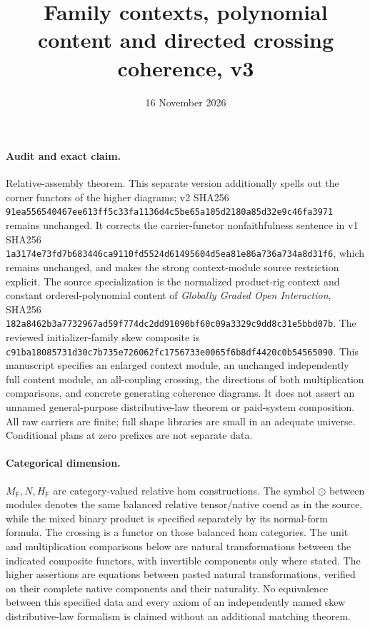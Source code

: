 \documentclass[11pt]{article}
\title{Family contexts, polynomial content and directed crossing coherence, v3}
\date{16 November 2026}
\begin{document}
\maketitle
\paragraph{Audit and exact claim.} Relative-assembly theorem. This separate version additionally spells out the corner functors of the higher diagrams; v2 SHA256 \texttt{91ea556540467ee613ff5c33fa1136d4c5be65a105d2180a85d32e9c46fa3971} remains unchanged. It corrects the carrier-functor nonfaithfulness sentence in v1 SHA256 \texttt{1a3174e73fd7b683446ca9110fd5524d61495604d5ea81e86a736a734a8d31f6}, which remains unchanged, and makes the strong context-module source restriction explicit. The source specialization is the normalized product-rig context and constant ordered-polynomial content of \emph{Globally Graded Open Interaction}, SHA256 \texttt{182a8462b3a7732967ad59f774dc2dd91090bf60c09a3329c9dd8c31e5bbd07b}. The reviewed initializer-family skew composite is \texttt{c91ba18085731d30c7b735e726062fc1756733e0065f6b8df4420c0b54565090}. This manuscript specifies an enlarged context module, an unchanged independently full content module, an all-coupling crossing, the directions of both multiplication comparisons, and concrete generating coherence diagrams. It does not assert an unnamed general-purpose distributive-law theorem or paid-system composition. All raw carriers are finite; full shape libraries are small in an adequate universe. Conditional plans at zero prefixes are not separate data.

\paragraph{Categorical dimension.} $M_{\mathsf F},N,H_{\mathsf F}$ are category-valued relative hom constructions. The symbol $\odot$ between modules denotes the same balanced relative tensor/native coend as in the source, while the mixed binary product is specified separately by its normal-form formula. The crossing is a functor on those balanced hom categories. The unit and multiplication comparisons below are natural transformations between the indicated composite functors, with invertible components only where stated. The higher assertions are equations between pasted natural transformations, verified on their complete native components and their naturality. No equivalence between this specified data and every axiom of an independently named skew distributive-law formalism is claimed without an additional matching theorem.
\end{document}
